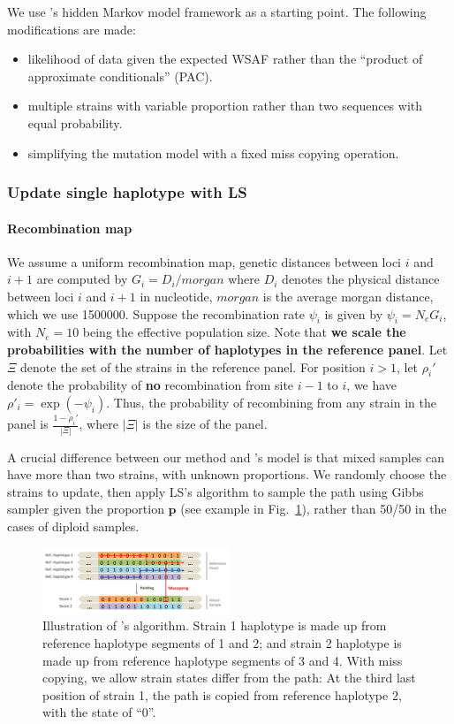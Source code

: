 \documentclass{bioinfo}
\begin{document}
We use \citet{Li2003}'s hidden Markov model framework as a starting point. The following modifications are made:
\begin{itemize}
\item likelihood of data given the expected WSAF rather than the ``product of approximate conditionals'' (PAC).
\item multiple strains with variable proportion rather than two sequences with equal probability.
\item simplifying the mutation model with a fixed miss copying operation.
\end{itemize}

\subsubsection{Update single haplotype with LS}

\paragraph{Recombination map}
We assume a uniform recombination map, genetic distances between loci $i$ and $i+1$ are computed by $G_i = D_i / morgan$ where $D_i$ denotes the physical distance between loci $i$ and $i+1$ in nucleotide, $morgan$ is the average morgan distance, which we use 1500000. Suppose the recombination rate $\psi_i$ is given by $\psi_i = N_e G_i$, with $N_e=10$ being the effective population size. Note that {\bf we scale the probabilities with the number of haplotypes in the reference panel}. Let $\Xi$ denote the set of the strains in the reference panel. For position $i > 1$, let $\rho_i'$ denote the probability of {\bf no} recombination from site $i-1$ to $i$, we have $\rho'_i = \exp(-\psi_i)$. Thus, the probability of recombining from any strain in the panel is $\displaystyle\frac{1-\rho_i'}{|\Xi|}$, where $|\Xi|$ is the size of the panel.


A crucial difference between our method and \citet{Li2003}'s model is that mixed samples can have more than two strains, with unknown proportions. We randomly choose the strains to update, then apply LS's algorithm to sample the path using Gibbs sampler given the proportion $\mathbf p$ (see example in Fig.~\ref{fig:ls}), rather than 50/50 in the cases of diploid samples.

\begin{figure}[ht]
\centering
\includegraphics[width=0.5\textwidth]{coupled-painting.png}
\caption{Illustration of \citet{Li2003}'s algorithm. Strain 1 haplotype is made up from reference haplotype segments of 1 and 2; and strain 2 haplotype is made up from reference haplotype segments of 3 and 4. With miss copying, we allow strain states differ from the path: At the third last position of strain 1, the path is copied from reference haplotype 2, with the state of ``0''.
}\label{fig:ls}
\end{figure}
\end{document}
